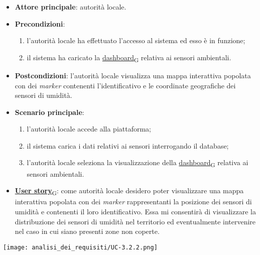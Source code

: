 \begin{itemize}
	\item \textbf{Attore principale}: autorità locale.
	\item \textbf{Precondizioni}:
	      \begin{enumerate}
		      \item l'autorità locale ha effettuato l'accesso al sistema ed esso è in funzione;
		      \item il sistema ha caricato la \href{https://7last.github.io/docs/pb/documentazione-interna/glossario\#dashboard}{dashboard\textsubscript{G}} relativa ai sensori ambientali.
	      \end{enumerate}
	\item \textbf{Postcondizioni}: l'autorità locale visualizza una mappa interattiva popolata con dei \textit{marker} contenenti l'identificativo e le coordinate geografiche dei sensori di umidità.
	\item \textbf{Scenario principale}:
	      \begin{enumerate}
		      \item l'autorità locale accede alla piattaforma;
		      \item il sistema carica i dati relativi ai sensori interrogando il database;
		      \item l'autorità locale seleziona la visualizzazione della \href{https://7last.github.io/docs/pb/documentazione-interna/glossario\#dashboard}{dashboard\textsubscript{G}} relativa ai sensori ambientali.
	      \end{enumerate}
	\item \href{https://7last.github.io/docs/pb/documentazione-interna/glossario\#user-story}{\textbf{User story}\textsubscript{G}}:
	      come autorità locale desidero poter visualizzare una mappa interattiva popolata con dei \textit{marker} rappresentanti la posizione dei sensori di umidità
	      e contenenti il loro identificativo. Essa mi consentirà di visualizzare la distribuzione dei sensori di umidità nel territorio ed eventualmente intervenire nel caso in cui siano presenti zone non coperte.
\end{itemize}
\begin{center}
	\texttt{[image: analisi\_dei\_requisiti/UC-3.2.2.png]}
\end{center}


